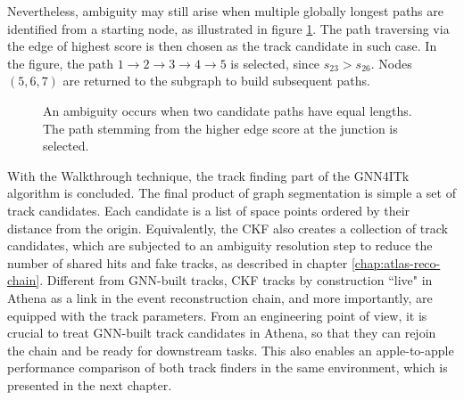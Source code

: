 Nevertheless, ambiguity may still arise when multiple globally longest paths are identified from a starting node, as illustrated in figure \ref{fig:walk-multi-longest}. 
The path traversing via the edge of highest score is then chosen as the track candidate in such case.
In the figure, the path $1\rightarrow 2 \rightarrow 3 \rightarrow 4 \rightarrow 5$ is selected, since $s_{23} > s_{26}$.
Nodes $(5,6,7)$ are returned to the subgraph to build subsequent paths.
\begin{figure}[h!]
    \centering
    \caption{An ambiguity occurs when two candidate paths have equal lengths. The path stemming from the higher edge score at the junction is selected. }
    \label{fig:walk-multi-longest}
\end{figure}
With the Walkthrough technique, the track finding part of the GNN4ITk algorithm is concluded.
The final product of graph segmentation is simple a set of track candidates.
Each candidate is a list of space points ordered by their distance from the origin. 
Equivalently, the CKF also creates a collection of track candidates, which are subjected to an ambiguity resolution step to reduce the number of shared hits and fake tracks, as described in chapter \ref{chap:atlas-reco-chain}. 
Different from GNN-built tracks, CKF tracks by construction ``live" in Athena as a link in the event reconstruction chain, and more importantly, are equipped with the track parameters. 
From an engineering point of view, it is crucial to treat GNN-built track candidates in Athena, so that they can rejoin the chain and be ready for downstream tasks.
This also enables an apple-to-apple performance comparison of both track finders in the same environment, which is presented in the next chapter.



